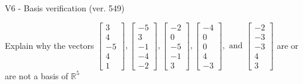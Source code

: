 \begin{exercise}
  \begin{exerciseTitle}V6 - Basis verification (ver. 549)\end{exerciseTitle}
  \begin{exerciseStatement}
    Explain why the vectors \(\left[\begin{array}{r}
3 \\
4 \\
-5 \\
4 \\
1
\end{array}\right] , \left[\begin{array}{r}
-5 \\
3 \\
-1 \\
-4 \\
-2
\end{array}\right] , \left[\begin{array}{r}
-2 \\
0 \\
-5 \\
-1 \\
3
\end{array}\right] , \left[\begin{array}{r}
-4 \\
0 \\
0 \\
4 \\
-3
\end{array}\right] , \text{ and } \left[\begin{array}{r}
-2 \\
-3 \\
-3 \\
4 \\
3
\end{array}\right]\) are or are not a basis of \(\mathbb{R}^5\)	



\end{exerciseStatement}
\end{exercise}

